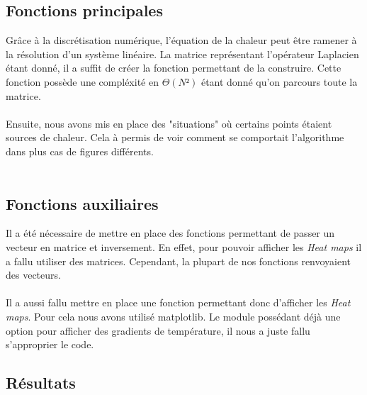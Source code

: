 

\subsection{Fonctions principales}
Grâce à la discrétisation numérique, l'équation de la chaleur peut être ramener à la résolution d'un système linéaire. 
La matrice représentant l'opérateur Laplacien étant donné, il a suffit de créer la fonction permettant de la construire.
Cette fonction possède une compléxité en $\Theta(N²)$ étant donné qu'on parcours toute la matrice.\\\\

Ensuite, nous avons mis en place des "situations" où certains points étaient sources de chaleur. Cela à permis de voir comment se comportait
l'algorithme dans plus cas de figures différents. \\\\





\subsection{Fonctions auxiliaires}
Il a été nécessaire de mettre en place des fonctions permettant de passer un vecteur en matrice et inversement.
En effet, pour pouvoir afficher les \emph{Heat maps} il a fallu utiliser des matrices. Cependant, la plupart de nos fonctions renvoyaient
des vecteurs. \\\\

Il a aussi fallu mettre en place une fonction permettant donc d'afficher les \emph{Heat maps}. Pour cela nous avons utilisé matplotlib.
Le module possédant déjà une option pour afficher des gradients de température, il nous a juste fallu s'approprier le code.


\subsection{Résultats}


